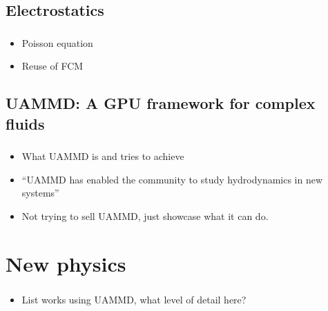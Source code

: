 \documentclass{beamer}
\begin{document}
\subsection{Electrostatics}
\begin{frame}
  \frametitle{\insertsubsectionnavigation{\linewidth}}
  \begin{itemize}
  \item Poisson equation
  \item Reuse of FCM
  \end{itemize}  
\end{frame}
    
\subsection{UAMMD: A GPU framework for complex fluids}
\begin{frame}
  \frametitle{\insertsubsectionnavigation{\linewidth}} 
  \begin{itemize}
  \item What UAMMD is and tries to achieve
  \item ``UAMMD has enabled the community to study hydrodynamics in new systems''
  \item Not trying to sell UAMMD, just showcase what it can do.    
  \end{itemize}
\end{frame}

\section{New physics}

\begin{frame}
  \frametitle{\insertsectionnavigation{\linewidth}} 
  \begin{itemize}
  \item List works using UAMMD, what level of detail here?
  \end{itemize}
\end{frame}
\end{document}
